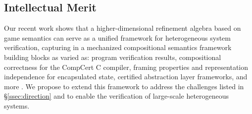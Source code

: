 
\subsection{Intellectual Merit}
\label{ssec:intro-itm}

Our recent work shows that
a higher-dimensional refinement algebra
based on game semantics
can serve as a unified framework for heterogeneous system verification,
capturing in a mechanized compositional semantics framework
building blocks as varied as:
program verification results,
compositional correctness for the CompCert C compiler,
framing properties and representation independence for encapsulated state,
certified abstraction layer frameworks, and more \cite{compcertoe}.
We propose to extend this framework
to address the challenges listed in \S\ref{ssec:direction} and
to enable the verification of large-scale heterogeneous systems.

